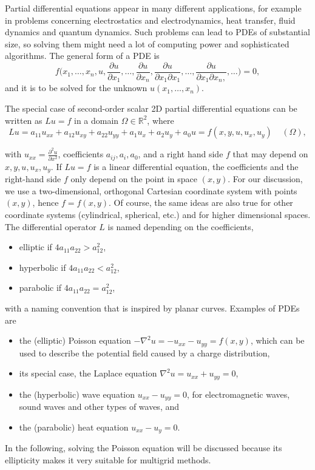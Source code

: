 Partial differential equations appear in many different applications, for example in problems concerning electrostatics and electrodynamics, heat transfer, fluid dynamics and quantum dynamics. Such problems can lead to PDEs of substantial size, so solving them might need a lot of computing power and sophisticated algorithms. The general form of a PDE is
\begin{equation}
f\big(x_1, \hdots, x_n, u, \frac{\partial u}{\partial x_1}, \hdots, \frac{\partial u}{\partial x_n}, \frac{\partial u}{\partial x_1 \partial x_1} , \hdots, \frac{\partial u}{\partial x_1 \partial x_n, },  \hdots \big) = 0, 
\end{equation}
and it is to be solved for the unknown $u(x_1, \hdots, x_n)$.

The special case of second-order scalar 2D partial differential equations can be written as $Lu = f$ in a domain $\Omega \in \mathbb{R}^2$, where 
\begin{equation}
Lu = a_{11}u_{xx} + a_{12}u_{xy} + a_{22}u_{yy} + a_{1}u_{x} + a_{2}u_{y} + a_{0}u = f(x, y, u, u_x, u_y)~~~~~(\Omega),
\label{equ:2D_part_differ}
\end{equation}

with $u_{xx} = \frac{\partial ^2u}{\partial x^2}$, coefficients $a_{ij}, a_i, a_0$, and a right hand side $f$ that may depend on $x, y, u, u_x, u_y$. If $Lu = f$ is a linear differential equation, the coefficients and the right-hand side $f$ only depend on the point in space $(x,y)$. For our discussion, we use a two-dimensional, orthogonal Cartesian coordinate system with points $(x,y)$, hence $f = f(x,y)$. Of course, the same ideas are also true for other coordinate systems (cylindrical, spherical, etc.) and for higher dimensional spaces.  The differential operator $L$ is named depending on the coefficients, 
\begin{itemize}
\item elliptic if $4a_{11}a_{22} > a_{12}^2$,
\item hyperbolic if $4a_{11}a_{22} < a_{12}^2$,
\item parabolic if $4a_{11}a_{22} = a_{12}^2$,
\end{itemize}
with a naming convention that is inspired by planar curves. Examples of PDEs are 
\begin{itemize}
\item the (elliptic) Poisson equation $-\nabla^2 u = -u_{xx} - u_{yy} = f(x,y)$, which can be used to describe the potential field caused by a charge distribution,
\item its special case, the Laplace equation $\nabla^2 u = u_{xx}  + u_{yy} = 0$,
\item the (hyperbolic) wave equation $u_{xx} - u_{yy} = 0$, for electromagnetic waves, sound waves and other types of waves, and
\item the (parabolic) heat equation $u_{xx} - u_y = 0$.
\end{itemize}
In the following, solving the Poisson equation will be discussed because its ellipticity makes it very suitable for multigrid methods.

